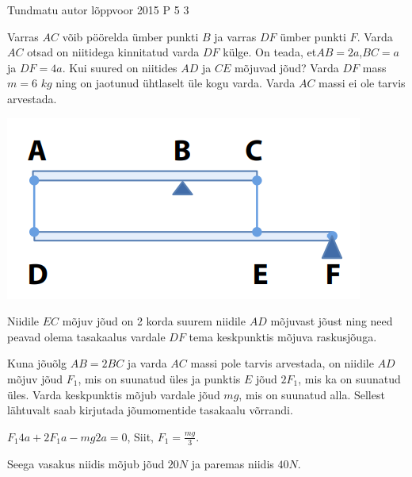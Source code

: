 {Tundmatu autor} %
{lõppvoor} %
{2015} %
{P 5} %
{3} %
{

\ifStatement
Varras $AC$ võib pöörelda ümber punkti $B$ ja varras $DF$ ümber punkti $F$. Varda $AC$ otsad on niitidega kinnitatud varda $DF$ külge. On teada, et$ AB = 2a$,$ BC = a$ ja $DF = 4a$. Kui suured on niitides $AD$ ja $CE$ mõjuvad jõud? Varda $DF$ mass $m = 6$ $kg$ ning on jaotunud ühtlaselt üle kogu varda. Varda $AC$ massi ei ole tarvis arvestada.
\begin{center}
	\includegraphics[width=0.5\linewidth]{2015-v3p-05-yl.PNG}
\end{center}
\fi

\ifHint
Niidile $EC$ mõjuv jõud on 2 korda suurem niidile $AD$ mõjuvast jõust ning need peavad olema tasakaalus vardale $DF$ tema keskpunktis mõjuva raskusjõuga.
\fi

\ifSolution
Kuna jõuõlg $AB = 2BC$ ja varda $AC$ massi pole tarvis arvestada, on niidile $AD$ mõjuv jõud $F_1$, mis on suunatud üles ja punktis $E$ jõud $2F_1$, mis ka on suunatud üles. Varda keskpunktis mõjub vardale jõud $mg$, mis on suunatud alla. Sellest lähtuvalt saab kirjutada jõumomentide tasakaalu võrrandi. 
\begin{center}
$F_1 4a + 2F_1 a - mg2a = 0$, Siit, $F_1 = \frac{mg}{3}$. 
\end{center}
Seega vasakus niidis mõjub jõud $20 N$ ja paremas niidis $40 N$.
\fi
}